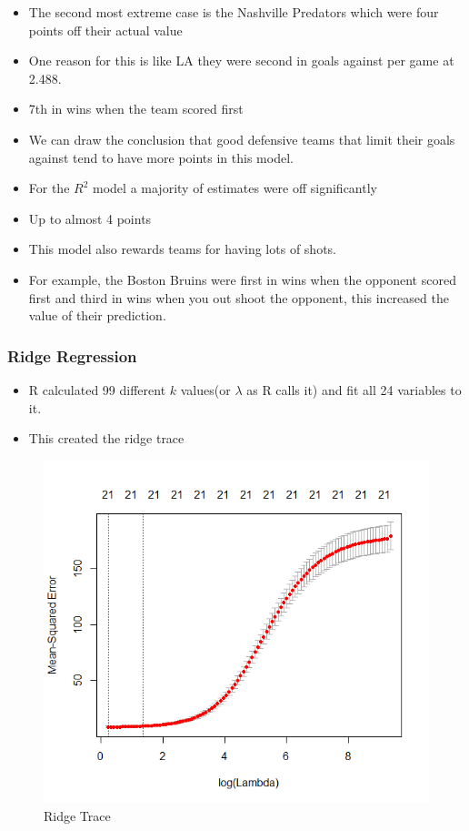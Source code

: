 \documentclass{beamer}
\begin{document}
\begin{frame}
	\begin{itemize}
		\item The second most extreme case is the Nashville Predators which were four points off their actual value 
		\item One reason for this is like LA they were second in goals against per game at 2.488. 
		\item 7th in wins when the team scored first
		\item We can draw the conclusion that good defensive teams that limit their goals against tend to have more points in this model. 
	\end{itemize}
\end{frame}
\begin{frame}
\begin{itemize}
	\item For the $R^2$ model a majority of estimates were off significantly
	\item Up to almost 4 points 
	\item This model also rewards teams for having lots of shots. 
	\item For example, the Boston Bruins were first in wins when the opponent scored first and third in wins when you out shoot the opponent, this increased the value of their prediction.
\end{itemize}
\end{frame}
\begin{frame}
	\frametitle{Ridge Regression}
\begin{itemize}
	\item R calculated 99 different $k$ values(or $\lambda$ as R calls it) and fit all 24 variables to it. \item This created the ridge trace
\end{itemize}	
\end{frame}
\begin{frame}
	\begin{figure}
		\centering
		\includegraphics[width=0.7\linewidth]{RidgeTrace}
		\caption{Ridge Trace}
		\label{fig:ridgetrace}
	\end{figure}
\end{frame}
\end{document}
